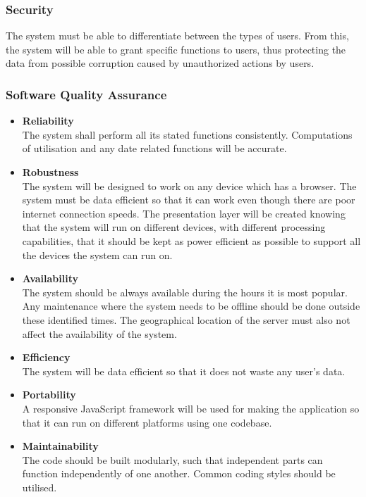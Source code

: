 \documentclass[a4paper, 12pt, oneside]{article}
\begin{document}
\subsubsection{Security}
The system must be able to differentiate between the types of users. From this, the system will be able to grant specific functions to users, thus protecting the data from possible corruption caused by unauthorized actions by users.

\subsubsection{Software Quality Assurance}

\begin{itemize}
	\item \textbf{Reliability}\\ The system shall perform all its stated functions consistently. Computations of utilisation and any date related functions will be accurate.
	\item \textbf{Robustness}\\The system will be designed to work on any device which has a browser. The system must be 		data efficient so that it can work even though there are poor internet connection speeds. The presentation layer will be 		created knowing that the system will run on different devices, with different processing capabilities, that it should be kept as 		power efficient as possible to support all the devices the system can run on.
	\item \textbf{Availability}\\The system should be always available during the hours it is most popular. Any maintenance 			where the system needs to be offline should be done outside these identified times. The geographical location of the server 		must also not affect the availability of the system.
	\item \textbf{Efficiency}\\ The system will be data efficient so that it does not waste any user’s data.
	\item \textbf{Portability}\\A responsive JavaScript framework will be used for making the application so that it can run on 		different platforms using one codebase.
	\item \textbf{Maintainability}\\The code should be built modularly, such that independent parts can function independently of 	one another. Common coding styles should be utilised.
	
\end{itemize}
\end{document}
